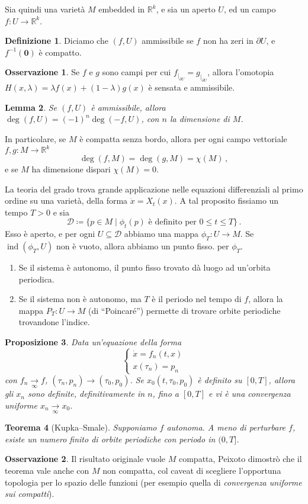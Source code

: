 \documentclass[a4paper, 11pt]{article}
\theoremstyle{definition}
\newtheorem{Def}{Definizione}
\newtheorem*{Oss}{Osservazione}
\theoremstyle{plain}
\newtheorem{Lemma}[Def]{Lemma}
\newtheorem{Prop}[Def]{Proposizione}
\newtheorem{Teo}[Def]{Teorema}
\newcommand{\zero}{\mathbf{0}}
\newcommand{\restr}[2]{{#1}_{|_{#2}}}
\newcommand{\R}{\mathbb{R}}
\newcommand{\DD}{\mathcal{D}}
\DeclareMathOperator{\ind}{ind}
\begin{document}
Sia quindi una varietà $M$ embedded in $\R^k$, e sia un aperto $U$, ed un campo $f \colon U \to \R^k$. 
\begin{Def}
	Diciamo che $(f,U)$ ammissibile se $f$ non ha zeri in $\partial U$, e $f^{-1}(\zero)$ è compatto.
\end{Def}
\begin{Oss}
	Se $f$ e $g$ sono campi per cui $\restr{f}{\partial U} = \restr{g}{\partial U}$, allora l'omotopia $H(x,\lambda) = \lambda f(x) + (1-\lambda)g(x)$ è sensata e ammissibile.
\end{Oss}


\begin{Lemma}
	Se $(f,U)$ è ammissibile, allora $\deg(f,U) = (-1)^n\deg(-f,U)$, con $n$ la dimensione di $M$.
\end{Lemma}

In particolare, se $M$ è compatta senza bordo, allora per ogni campo vettoriale $f,g \colon M \to \R^k$
\[
	\deg(f,M) = \deg(g,M) = \chi(M)\,,
\]
e se $M$ ha dimensione dispari $\chi(M) = 0$.

La teoria del grado trova grande applicazione nelle equazioni differenziali al primo ordine su una varietà, della forma $\dot{x} = X_t(x)$. A tal proposito fissiamo un tempo $T > 0$ e sia
\[
	\DD \coloneqq \{p \in M \mid \phi_t(p) \text{ è definito per } 0 \le t \le T\}\,.
\]
Esso è aperto, e per ogni $U \subseteq \DD$ abbiamo una mappa $\phi_T \colon U \to M$. Se $\ind(\phi_T, U)$ non è vuoto, allora abbiamo un punto fisso. per $\phi_T$.

\begin{enumerate}
	\item Se il sistema è autonomo, il punto fisso trovato dà luogo ad un'orbita periodica.
	\item Se il sistema non è autonomo, ma $T$ è il periodo nel tempo di $f$, allora la mappa $P_T \colon U \to M$ (di ``Poincaré'') permette di trovare orbite periodiche trovandone l'indice. 
\end{enumerate}

\begin{Prop}
	Data un'equazione della forma
	\[
		\begin{cases}
			\dot{x} = f_n(t,x) \\
			x(\tau_n) = p_n
		\end{cases}
	\]
	con $f_n \underset{\infty}{\to} f$, $(\tau_n ,p_n) \to (\tau_0, p_0)$. Se $x_0(t, \tau_0, p_0)$ è definito su $[0,T]$, allora gli $x_n$ sono definite, definitivamente in $n$, fino a $[0,T]$ e vi è una convergenza uniforme $x_n \underset{\infty}{\to} x_0$.
\end{Prop}
\begin{Teo}[Kupka--Smale]
	Supponiamo $f$ autonoma. A meno di perturbare $f$, esiste un numero finito di orbite periodiche con periodo in $(0,T]$. 
\end{Teo}
\begin{Oss}
	Il risultato originale vuole $M$ compatta, Peixoto dimostrò che il teorema vale anche con $M$ non compatta, col caveat di scegliere l'opportuna topologia per lo spazio delle funzioni (per esempio quella di \emph{convergenza uniforme sui compatti}).
\end{Oss}
\end{document}
